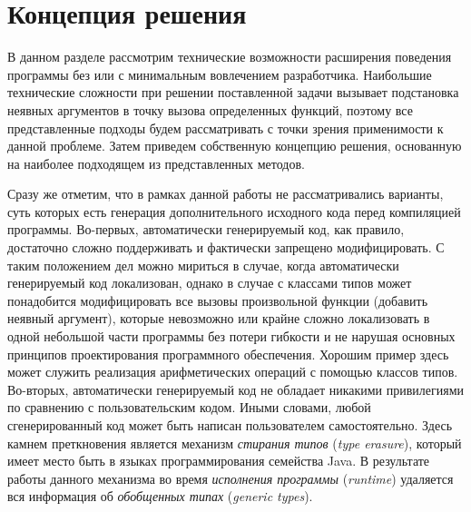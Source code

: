 \chapter{Концепция решения}

В данном разделе рассмотрим технические возможности расширения поведения программы без или с минимальным вовлечением разработчика. Наибольшие технические сложности при решении поставленной задачи вызывает подстановка неявных аргументов в точку вызова определенных функций, поэтому все представленные подходы будем рассматривать с точки зрения применимости к данной проблеме. Затем приведем собственную концепцию решения, основанную на наиболее подходящем из представленных методов.

Сразу же отметим, что в рамках данной работы не рассматривались варианты, суть которых есть генерация дополнительного исходного кода перед компиляцией программы. Во-первых, автоматически генерируемый код, как правило, достаточно сложно поддерживать и фактически запрещено модифицировать. С таким положением дел можно мириться в случае, когда автоматически генерируемый код локализован, однако в случае с классами типов может понадобится модифицировать все вызовы произвольной функции (добавить неявный аргумент), которые невозможно или крайне сложно локализовать в одной небольшой части программы без потери гибкости и не нарушая основных принципов проектирования программного обеспечения. Хорошим пример здесь может служить реализация арифметических операций с помощью классов типов. Во-вторых, автоматически генерируемый код не обладает никакими привилегиями по сравнению с пользовательским кодом. Иными словами, любой сгенерированный код может быть написан пользователем самостоятельно. Здесь камнем преткновения является механизм \emph{стирания типов} (\emph{type erasure}), который имеет место быть в языках программирования семейства Java. В результате работы данного механизма во время \emph{исполнения программы} (\emph{runtime}) удаляется вся информация об \emph{обобщенных типах} (\emph{generic types}). 

